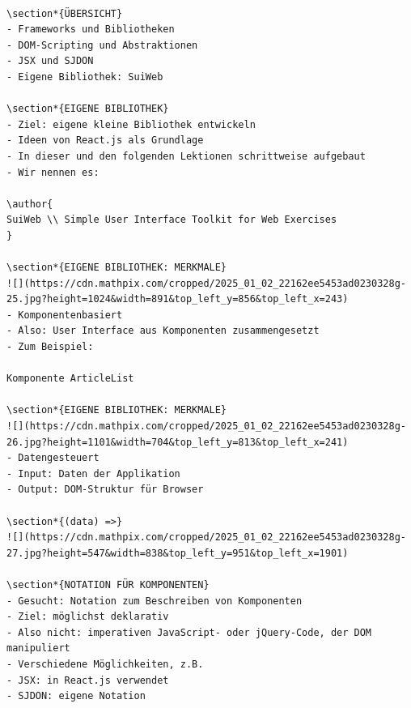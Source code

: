 \documentclass[10pt]{article}
\begin{document}
\begin{verbatim}

\section*{ÜBERSICHT}
- Frameworks und Bibliotheken
- DOM-Scripting und Abstraktionen
- JSX und SJDON
- Eigene Bibliothek: SuiWeb

\section*{EIGENE BIBLIOTHEK}
- Ziel: eigene kleine Bibliothek entwickeln
- Ideen von React.js als Grundlage
- In dieser und den folgenden Lektionen schrittweise aufgebaut
- Wir nennen es:

\author{
SuiWeb \\ Simple User Interface Toolkit for Web Exercises
}

\section*{EIGENE BIBLIOTHEK: MERKMALE}
![](https://cdn.mathpix.com/cropped/2025_01_02_22162ee5453ad0230328g-25.jpg?height=1024&width=891&top_left_y=856&top_left_x=243)
- Komponentenbasiert
- Also: User Interface aus Komponenten zusammengesetzt
- Zum Beispiel:

Komponente ArticleList

\section*{EIGENE BIBLIOTHEK: MERKMALE}
![](https://cdn.mathpix.com/cropped/2025_01_02_22162ee5453ad0230328g-26.jpg?height=1101&width=704&top_left_y=813&top_left_x=241)
- Datengesteuert
- Input: Daten der Applikation
- Output: DOM-Struktur für Browser

\section*{(data) =>}
![](https://cdn.mathpix.com/cropped/2025_01_02_22162ee5453ad0230328g-27.jpg?height=547&width=838&top_left_y=951&top_left_x=1901)

\section*{NOTATION FÜR KOMPONENTEN}
- Gesucht: Notation zum Beschreiben von Komponenten
- Ziel: möglichst deklarativ
- Also nicht: imperativen JavaScript- oder jQuery-Code, der DOM manipuliert
- Verschiedene Möglichkeiten, z.B.
- JSX: in React.js verwendet
- SJDON: eigene Notation
\end{verbatim}
\end{document}
